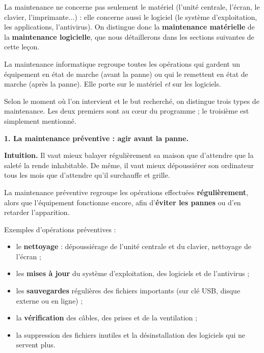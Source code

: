 \documentclass[11pt]{article}
\newcommand{\cle}[1]{{\popxbold\color{popdark}#1}}
\newcounter{popsec}
\newcounter{popsub}
\newcommand{\courssub}[1]{%
  \stepcounter{popsub}%
  \par\vspace{9pt}\noindent{\popxbold\fontsize{11.5}{13}\selectfont\color{popink}{\color{poporange}\thepopsec.\thepopsub}\hspace{6pt}#1}\par\nopagebreak\vspace{4pt}
}
\begin{document}
La maintenance ne concerne pas seulement le \cle{matériel} (l'unité centrale, l'écran, le clavier, l'imprimante...) : elle concerne aussi le \cle{logiciel} (le système d'exploitation, les applications, l'antivirus). On distingue donc la \textbf{maintenance matérielle} de la \textbf{maintenance logicielle}, que nous détaillerons dans les sections suivantes de cette leçon.

\begin{aretenir}[L'essentiel]
La maintenance informatique regroupe toutes les opérations qui gardent un équipement en état de marche (avant la panne) ou qui le remettent en état de marche (après la panne). Elle porte sur le matériel \emph{et} sur les logiciels.
\end{aretenir}

\courssub{Les trois types de maintenance}

Selon le moment où l'on intervient et le but recherché, on distingue trois types de maintenance. Les deux premiers sont au cœur du programme ; le troisième est simplement mentionné.

\textbf{1. La maintenance préventive : agir avant la panne.}

\textbf{Intuition.} Il vaut mieux balayer régulièrement sa maison que d'attendre que la saleté la rende inhabitable. De même, il vaut mieux dépoussiérer son ordinateur tous les mois que d'attendre qu'il surchauffe et grille.

\begin{definition}
La \cle{maintenance préventive} regroupe les opérations effectuées \textbf{régulièrement}, alors que l'équipement fonctionne encore, afin d'\textbf{éviter les pannes} ou d'en retarder l'apparition.
\end{definition}

Exemples d'opérations préventives :
\begin{itemize}
\item le \textbf{nettoyage} : dépoussiérage de l'unité centrale et du clavier, nettoyage de l'écran ;
\item les \textbf{mises à jour} du système d'exploitation, des logiciels et de l'antivirus ;
\item les \textbf{sauvegardes} régulières des fichiers importants (sur clé USB, disque externe ou en ligne) ;
\item la \textbf{vérification} des câbles, des prises et de la ventilation ;
\item la suppression des fichiers inutiles et la désinstallation des logiciels qui ne servent plus.
\end{itemize}
\end{document}
